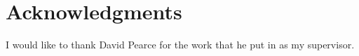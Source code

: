 \chapter*{Acknowledgments}\label{C:ack} 
I would like to thank David Pearce for the work that he put in as my supervisor. 
